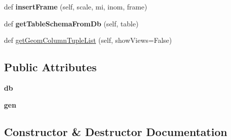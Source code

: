 \begin{DoxyCompactItemize}
def {\bfseries insert\+Frame} (self, scale, mi, inom, frame)
\item 
\mbox{\label{class_dsg_tools_1_1_factories_1_1_db_factory_1_1spatialite_db_1_1_spatialite_db_a418d4db03e7c62d50f3f74c4ac6081b6}} 
def {\bfseries get\+Table\+Schema\+From\+Db} (self, table)
\item 
def \mbox{\hyperlink{class_dsg_tools_1_1_factories_1_1_db_factory_1_1spatialite_db_1_1_spatialite_db_a411711f692f22e812ba5323c5e5713f7}{get\+Geom\+Column\+Tuple\+List}} (self, show\+Views=False)
\end{DoxyCompactItemize}
\subsection*{Public Attributes}
\begin{DoxyCompactItemize}
\item 
\mbox{\label{class_dsg_tools_1_1_factories_1_1_db_factory_1_1spatialite_db_1_1_spatialite_db_a1b76decde48e4cc30307d4c2373f1660}} 
{\bfseries db}
\item 
\mbox{\label{class_dsg_tools_1_1_factories_1_1_db_factory_1_1spatialite_db_1_1_spatialite_db_aaaf9b170e755cdfb7b2ffc648f815a00}} 
{\bfseries gen}
\end{DoxyCompactItemize}


\subsection{Constructor \& Destructor Documentation}
\mbox{\label{class_dsg_tools_1_1_factories_1_1_db_factory_1_1spatialite_db_1_1_spatialite_db_ab504e65c1f5d7ad3acc3c7739f939cec}} 
